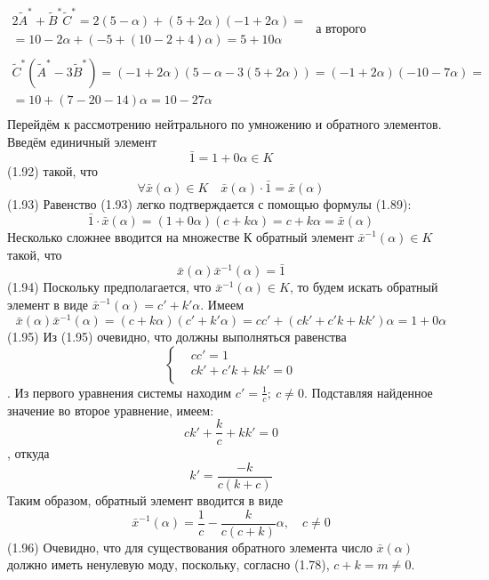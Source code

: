 	$\begin{matrix}
  2{{{\tilde{A}}}^{*}}+{{{\tilde{B}}}^{*}}{{{\tilde{C}}}^{*}}=2\left( 5-\alpha  \right)+\left( 5+2\alpha  \right)\left( -1+2\alpha  \right)= \\ 
  =10-2\alpha +\left( -5+\left( 10-2+4 \right)\alpha  \right)=5+10\alpha  \\ 
\end{matrix}$
а второго
	\[\begin{matrix}
  {{{\tilde{C}}}^{*}}\left( {{{\tilde{A}}}^{*}}-3{{{\tilde{B}}}^{*}} \right)=\left( -1+2\alpha  \right)\left( 5-\alpha -3\left( 5+2\alpha  \right) \right)=\left( -1+2\alpha  \right)\left( -10-7\alpha  \right)= \\ 
  =10+\left( 7-20-14 \right)\alpha =10-27\alpha  \\ 
\end{matrix}\] 
Перейдём к рассмотрению нейтрального по умножению и обратного элементов. Введём единичный элемент
	\[\bar{1}=1+0\alpha \in K\] 	(1.92)
такой, что 
	\[\forall \bar{x}\left( \alpha  \right)\in K\quad \bar{x}\left( \alpha  \right)\cdot \bar{1}=\bar{x}\left( \alpha  \right)\] 	(1.93)
Равенство (1.93) легко подтверждается с помощью формулы (1.89):
	\[\bar{1}\cdot \bar{x}(\alpha )=(1+0\alpha )(c+k\alpha )=c+k\alpha =\bar{x}(\alpha )\] 
Несколько сложнее вводится на множестве К обратный элемент ${{\bar{x}}^{-1}}\left( \alpha  \right)\in K$ такой, что
	\[\bar{x}\left( \alpha  \right){{\bar{x}}^{-1}}\left( \alpha  \right)=\bar{1}\] 	(1.94)
Поскольку предполагается, что ${{\bar{x}}^{-1}}\left( \alpha  \right)\in K$, то будем искать обратный элемент в виде ${{\bar{x}}^{-1}}\left( \alpha  \right)={c}'+{k}'\alpha $. Имеем
	\[\bar{x}\left( \alpha  \right){{\bar{x}}^{-1}}\left( \alpha  \right)=\left( c+k\alpha  \right)\left( {c}'+{k}'\alpha  \right)=c{c}'+\left( c{k}'+{c}'k+k{k}' \right)\alpha =1+0\alpha \] 	(1.95)
Из (1.95) очевидно, что должны выполняться равенства
	\[\left\{ \begin{aligned}
  & c{c}'=1 \\ 
 & c{k}'+{c}'k+k{k}'=0 \\ 
\end{aligned} \right.\].
Из первого уравнения системы находим ${c}'=\frac{1}{c};\ c\ne 0$. Подставляя найденное значение во второе уравнение, имеем:
	\[c{k}'+\frac{k}{c}+k{k}'=0\],
откуда
	\[{k}'=\frac{-k}{c(k+c)}\] 
Таким образом, обратный элемент вводится в виде
	\[{{\bar{x}}^{-1}}(\alpha )=\frac{1}{c}-\frac{k}{c(c+k)}\alpha ,\quad c\ne 0\] 	(1.96)
Очевидно, что для существования обратного элемента число $\bar{x}\left( \alpha  \right)$ должно иметь ненулевую моду, поскольку, согласно (1.78), $c+k=m\ne 0$.
